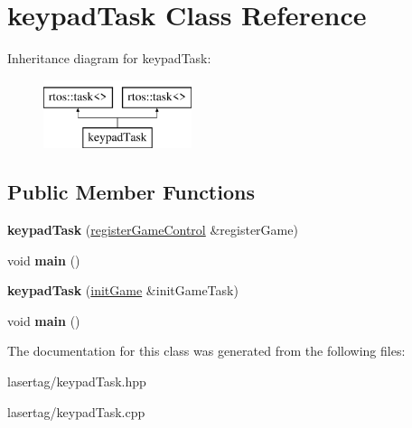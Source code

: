 \hypertarget{classkeypad_task}{}\section{keypad\+Task Class Reference}
\label{classkeypad_task}
Inheritance diagram for keypad\+Task\+:\begin{figure}[H]
\begin{center}
\leavevmode
\includegraphics[height=2.000000cm]{classkeypad_task}
\end{center}
\end{figure}
\subsection*{Public Member Functions}
\begin{DoxyCompactItemize}
\item 
\mbox{\label{classkeypad_task_acaa6c07951ed2676c09e6110ba6e3a80}} 
{\bfseries keypad\+Task} (\mbox{\hyperlink{classregister_game_control}{register\+Game\+Control}} \&register\+Game)
\item 
\mbox{\label{classkeypad_task_a32ea704ed454b4ecee6f805605133dd0}} 
void {\bfseries main} ()
\item 
\mbox{\label{classkeypad_task_ae4ff67f9cdad93df810036f66d3f22f5}} 
{\bfseries keypad\+Task} (\mbox{\hyperlink{classinit_game}{init\+Game}} \&init\+Game\+Task)
\item 
\mbox{\label{classkeypad_task_a32ea704ed454b4ecee6f805605133dd0}} 
void {\bfseries main} ()
\end{DoxyCompactItemize}


The documentation for this class was generated from the following files\+:\begin{DoxyCompactItemize}
\item 
lasertag/keypad\+Task.\+hpp\item 
lasertag/keypad\+Task.\+cpp\end{DoxyCompactItemize}
